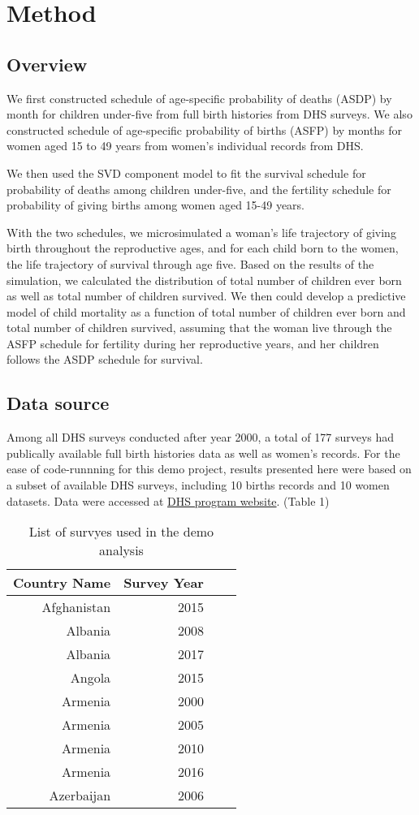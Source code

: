 \documentclass[11pt,letterpaper]{article}
\begin{document}
\section{Method}
\subsection*{Overview}
We first constructed schedule of age-specific probability of deaths (ASDP) by month for children under-five from full birth histories from DHS surveys. We also constructed schedule of age-specific probability of births (ASFP) by months for women aged 15 to 49 years from women's individual records from DHS. 

We then used the SVD component model to fit the survival schedule for probability of deaths among children under-five, and the fertility schedule for probability of giving births among women aged 15-49 years.  

With the two schedules, we microsimulated a woman's life trajectory of giving birth throughout the reproductive ages, and for each child born to the women, the life trajectory of survival through age five. Based on the results of the simulation, we calculated the distribution of total number of children ever born as well as total number of children survived. We then could develop a predictive model of child mortality as a function of total number of children ever born and total number of children survived, assuming that the woman live through the ASFP schedule for fertility during her reproductive years, and her children follows the ASDP schedule for survival.  


\subsection*{Data source}
Among all DHS surveys conducted after year 2000, a total of 177 surveys had publically available full birth histories data as well as women's records. For the ease of code-runnning for this demo project, results presented here were based on a subset of available DHS surveys, including 10 births records and 10 women datasets. Data were accessed at \href{https://dhsprogram.com/data/available-datasets.cfm}{DHS program website}. (Table 1)  

\begin{table}[ht]
\centering
\begin{tabular}{rrrr}
  \hline
 Country Name & Survey Year \\ 
  \hline
Afghanistan & 2015 \\
Albania & 2008 \\
Albania & 2017 \\
Angola & 2015 \\
Armenia & 2000 \\
Armenia & 2005 \\
Armenia & 2010 \\
Armenia & 2016 \\
Azerbaijan & 2006 \\ 
   \hline
\end{tabular}
\caption{List of survyes used in the demo analysis} 
\label{tab:table1}
\end{table}
\end{document}
